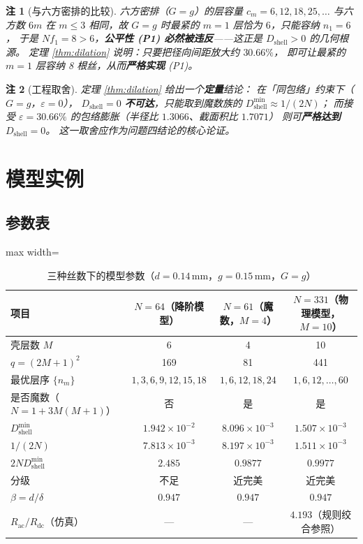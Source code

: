 \documentclass[12pt, a4paper]{ctexart}
\newtheorem{remark}{注}[section]
\newcommand{\Umm}{\ensuremath{\,\mathrm{mm}}}
\newcommand{\Rac}{R_{\mathrm{ac}}}
\newcommand{\Rdc}{R_{\mathrm{dc}}}
\begin{document}
\begin{remark}[与六方密排的比较]
六方密排（$G=g$）的层容量 $c_m = 6,12,18,25,\dots$ 与六方数 $6m$ 在 $m\le3$
相同，故 $G=g$ 时最紧的 $m=1$ 层恰为 $6$，只能容纳 $n_1=6$，
于是 $Nf_1 = 8 > 6$，\textbf{公平性 (P1) 必然被违反}——这正是
$D_{\mathrm{shell}}>0$ 的几何根源。
定理 \ref{thm:dilation} 说明：只要把径向间距放大约 $30.66\%$，
即可让最紧的 $m=1$ 层容纳 8 根丝，从而\textbf{严格实现} (P1)。
\end{remark}

\begin{remark}[工程取舍]
定理 \ref{thm:dilation} 给出一个\textbf{定量}结论：
在「同包络」约束下（$G=g$，$\varepsilon=0$），
$D_{\mathrm{shell}}=0$ \textbf{不可达}，只能取到魔数族的
$D_{\mathrm{shell}}^{\min}\approx 1/(2N)$；
而接受 $\varepsilon=30.66\%$ 的包络膨胀（半径比 $1.3066$、截面积比 $1.7071$）
则可\textbf{严格达到} $D_{\mathrm{shell}}=0$。
这一取舍应作为问题四结论的核心论证。
\end{remark}

\section{模型实例}

\subsection{参数表}

\begin{table}[htbp]
\centering
\caption{三种丝数下的模型参数（$d=0.14\Umm$，$g=0.15\Umm$，$G=g$）}
\label{tab:instances}
\begin{adjustbox}{max width=\textwidth}
\begin{tabular}{lccc}
\toprule
项目 & $N=64$（降阶模型） & $N=61$（魔数，$M=4$） & $N=331$（物理模型，$M=10$）\\
\midrule
壳层数 $M$ & 6 & 4 & 10 \\
$q=(2M+1)^2$ & 169 & 81 & 441 \\
最优层序 $\{n_m\}$ & $1,3,6,9,12,15,18$ & $1,6,12,18,24$ & $1,6,12,\dots,60$ \\
是否魔数（$N=1+3M(M+1)$）& 否 & 是 & 是 \\
$D_{\mathrm{shell}}^{\min}$ & $1.942\times10^{-2}$ & $8.096\times10^{-3}$ & $1.507\times10^{-3}$ \\
$1/(2N)$ & $7.813\times10^{-3}$ & $8.197\times10^{-3}$ & $1.511\times10^{-3}$ \\
$2N D_{\mathrm{shell}}^{\min}$ & $2.485$ & $0.9877$ & $0.9977$ \\
分级 & 不足 & 近完美 & 近完美 \\
$\beta = d/\delta$ & $0.947$ & $0.947$ & $0.947$ \\
$\Rac/\Rdc$（仿真） & --- & --- & $4.193$（规则绞合参照）\\
\bottomrule
\end{tabular}
\end{adjustbox}
\end{table}
\end{document}
